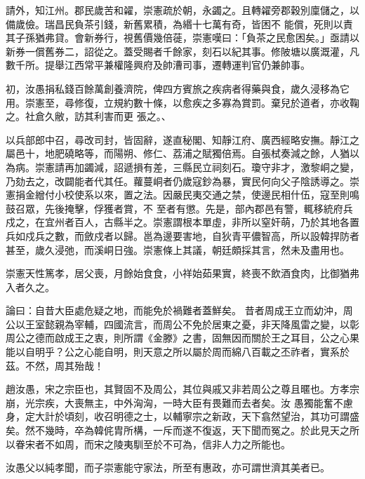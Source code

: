 \begin{pinyinscope}
 請外，知江州。郡民歲苦和糴，崇憲疏於朝，永蠲之。且轉糴旁郡穀別廩儲之，以備歲儉。瑞昌民負茶引錢，新舊累積，為緡十七萬有奇，皆困不
 能償，死則以責其子孫猶弗貸。會新券行，視舊價幾倍蓰，崇憲嘆曰：「負茶之民愈困矣。」亟請以新券一償舊券二，詔從之。蓋受賜者千餘家，刻石以紀其事。修陂塘以廣溉灌，凡數千所。提舉江西常平兼權隆興府及帥漕司事，遷轉運判官仍兼帥事。



 初，汝愚捐私錢百餘萬創養濟院，俾四方賓旅之疾病者得藥與食，歲久浸移為它用。崇憲至，尋修復，立規約數十條，以愈疾之多寡為賞罰。棄兒於道者，亦收鞠之。社倉久敝，訪其利害而更
 張之。、



 以兵部郎中召，尋改司封，皆固辭，遂直秘閣、知靜江府、廣西經略安撫。靜江之屬邑十，地肥磽略等，而陽朔、修仁、荔浦之賦獨倍焉。自張栻奏減之餘，人猶以為病。崇憲請再加蠲減，詔遞損有差，三縣民立祠刻石。瓊守非才，激黎峒之變，乃劾去之，改闢能者代其任。蘿蔓峒者仍歲寇鈔為暴，實民何向父子陰誘導之。崇憲捐金繒付小校使系以來，置之法。因嚴民夷交通之禁，使邊民相什伍，寇至則鳴鼓召眾，先後掩擊，俘獲者賞，不
 至者有懲。先是，部內郡邑有警，輒移統府兵戍之，在宜州者百人，古縣半之。崇憲謂根本單虛，非所以窒奸萌，乃於其地各置兵如戍兵之數，而斂戍者以歸。邕為邊要害地，自狄青平儂智高，所以設韓捍防者甚至，歲久浸弛，而溪峒日強。崇憲條上其議，朝廷頗採其言，然未及盡用也。



 崇憲天性篤孝，居父喪，月餘始食食，小祥始茹果實，終喪不飲酒食肉，比御猶弗入者久之。



 論曰：自昔大臣處危疑之地，而能免於禍難者蓋鮮矣。
 昔者周成王立而幼沖，周公以王室懿親為宰輔，四國流言，而周公不免於居東之憂，非天降風雷之變，以彰周公之德而啟成王之衷，則所謂《金滕》之書，固無因而關於王之耳目，公之心果能以自明乎？公之心能自明，則天意之所以屬於周而綿八百載之丕祚者，實系於茲。不然，周其殆哉！



 趙汝愚，宋之宗臣也，其賢固不及周公，其位與戚又非若周公之尊且暱也。方孝宗崩，光宗疾，大喪無主，中外洶洶，一時大臣有畏難而去者矣。汝
 愚獨能奮不慮身，定大計於頃刻，收召明德之士，以輔寧宗之新政，天下翕然望治，其功可謂盛矣。然不幾時，卒為韓侂胄所構，一斥而遂不復返，天下聞而冤之。於此見天之所以眷宋者不如周，而宋之陵夷馴至於不可為，信非人力之所能也。



 汝愚父以純孝聞，而子崇憲能守家法，所至有惠政，亦可謂世濟其美者已。



\end{pinyinscope}